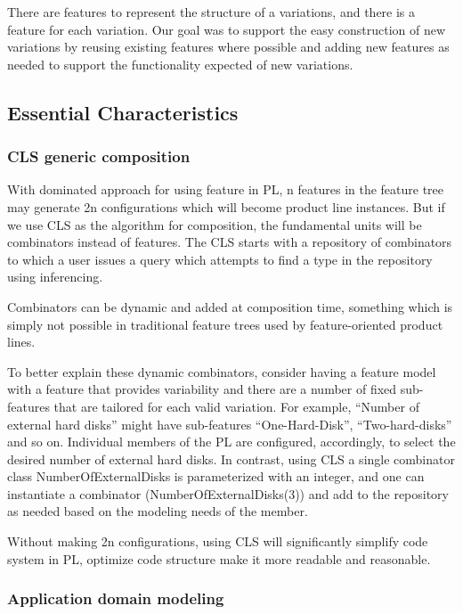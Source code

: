 
There are features to represent the structure of a variations, and there is a feature for each variation.
Our goal was to support the easy construction of new variations by reusing existing features where possible
and adding new features as needed to support the functionality expected of new variations.


\subsection{Essential Characteristics}

\subsubsection{CLS generic composition}

With dominated approach for using feature in PL, n features in the feature tree may generate 2n configurations
 which will become product line instances. But if we use CLS as the algorithm for composition, the fundamental
 units will be combinators instead of features. The CLS starts with a repository of combinators to which a user
 issues a query which attempts to find a type in the repository using inferencing.

Combinators can be dynamic and added at composition time, something which is simply not possible in traditional
feature trees used by feature-oriented product lines.

To better explain these dynamic combinators, consider having a feature model with a feature that provides
variability and there are a number of fixed sub-features that are tailored for each valid variation.
For example, “Number of external hard disks” might have sub-features “One-Hard-Disk”, “Two-hard-disks” and
so on. Individual members of the PL are configured, accordingly, to select the desired number of external hard
disks. In contrast, using CLS a single combinator class NumberOfExternalDisks is parameterized with an integer,
and one can instantiate a combinator (NumberOfExternalDisks(3)) and add to the repository as needed based on
the modeling needs of the member.

Without making 2n configurations, using CLS will significantly simplify code system in PL, optimize code structure
make it more readable and reasonable.

\subsubsection{Application domain modeling}

